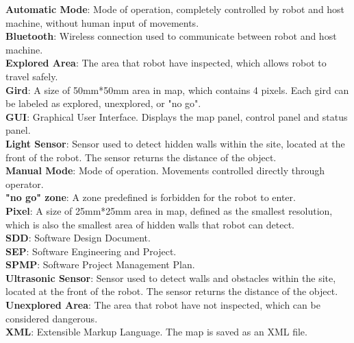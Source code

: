 \documentclass[11pt, a4paper]{report}
\begin{document}
\textbf{Automatic Mode}:  Mode of operation, completely controlled by robot and host machine, without human input of movements. 
\\ \textbf{Bluetooth}: Wireless connection used to communicate between robot and host machine.
\\ \textbf{Explored Area}: The area that robot have inspected, which allows robot to travel safely.  
\\ \textbf{Gird}: A size of 50mm*50mm area in map, which contains 4 pixels. Each gird can be labeled as explored, unexplored, or "no go".
\\ \textbf{GUI}: Graphical User Interface. Displays the map panel, control panel and status panel.
\\ \textbf{Light Sensor}: Sensor used to detect hidden walls within the site, located at the front of the robot. The sensor returns the distance of the object.
\\ \textbf{Manual Mode}: Mode of operation. Movements controlled directly through operator.
\\ \textbf{"no go" zone}: A zone predefined is forbidden for the robot to enter. 
\\ \textbf{Pixel}: A size of 25mm*25mm area in map, defined as the smallest resolution, which is also the smallest area of hidden walls that robot can detect.  
\\ \textbf{SDD}: Software Design Document.
\\ \textbf{SEP}: Software Engineering and Project.
\\ \textbf{SPMP}: Software Project Management Plan.
\\ \textbf{Ultrasonic Sensor}: Sensor used to detect walls and obstacles within the site, located at the front of the robot. The sensor returns the distance of the object.
\\ \textbf{Unexplored Area}: The area that robot have not inspected, which can be considered dangerous.  
\\ \textbf{XML}: Extensible Markup Language. The map is saved as an XML file.
\end{document}
